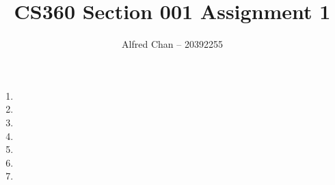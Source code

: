 \documentclass[12pt]{article}
\title{CS360 Section 001 Assignment 1}
\author{Alfred Chan -- 20392255}
\begin{document}
\maketitle

\begin{enumerate}
\item
\item
\item
\item
\item
\item
\item
\end{enumerate}
\end{document}
